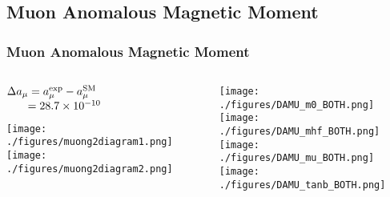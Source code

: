 \documentclass[hyperref={bookmarks=false},aspectratio=169]{beamer}
\begin{document}







\subsection{Muon Anomalous Magnetic Moment}


\begin{frame}
\frametitle{Muon Anomalous Magnetic Moment}
\centering

\begin{columns}
	\begin{column}{0.25\textwidth}
{\scriptsize 	
		$\Delta{a_\mu} = a_\mu^{\rm exp} - a_\mu^{\rm SM}$ \\
$ \hspace{0.65cm} = 28.7 \times 10^{-10} $
}
\pause

\vspace{0.5cm}
\texttt{[image: ./figures/muong2diagram1.png]}
\vspace{0.5cm}
\texttt{[image: ./figures/muong2diagram2.png]}
\pause

	\end{column}

	\begin{column}{0.75\textwidth}
		
		\texttt{[image: ./figures/DAMU\_m0\_BOTH.png]} 
		\texttt{[image: ./figures/DAMU\_mhf\_BOTH.png]} \\
		
		
		\centering
		\texttt{[image: ./figures/DAMU\_mu\_BOTH.png]} 
		\pause
		\texttt{[image: ./figures/DAMU\_tanb\_BOTH.png]} \\	
		
	\end{column}
		
	
\end{columns}


\end{frame}

\end{document}

